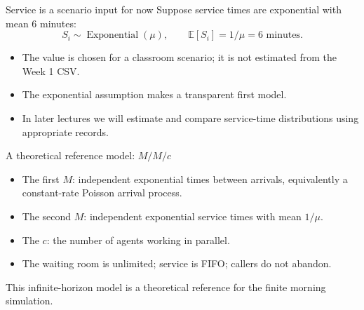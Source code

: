 \documentclass{beamer}
\begin{document}
\begin{frame}{Service is a scenario input for now}
  Suppose service times are exponential with mean 6 minutes:
  \[
    S_i\sim\operatorname{Exponential}(\mu),
    \qquad \mathbb E[S_i]=1/\mu=6\text{ minutes}.
  \]
  \begin{itemize}
    \item The value is chosen for a classroom scenario; it is not estimated from the Week 1 CSV.
    \item The exponential assumption makes a transparent first model.
    \item In later lectures we will estimate and compare service-time distributions using appropriate records.
  \end{itemize}
\end{frame}

\begin{frame}{A theoretical reference model: $M/M/c$}
  \centering

  \raggedright
  \vspace{0.9em}
  \begin{itemize}
    \item The first $M$: independent exponential times between arrivals, equivalently a constant-rate Poisson arrival process.
    \item The second $M$: independent exponential service times with mean $1/\mu$.
    \item The $c$: the number of agents working in parallel.
    \item The waiting room is unlimited; service is FIFO; callers do not abandon.
  \end{itemize}

  \vspace{0.3em}
  This infinite-horizon model is a theoretical reference for the finite morning simulation.
\end{frame}
\end{document}
